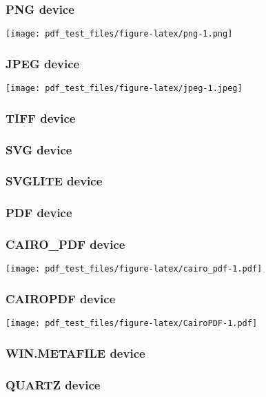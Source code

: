 \documentclass[]{article}
\begin{document}
\subsubsection{PNG device}\label{png-device}

\texttt{[image: pdf\_test\_files/figure-latex/png-1.png]}

\subsubsection{JPEG device}\label{jpeg-device}

\texttt{[image: pdf\_test\_files/figure-latex/jpeg-1.jpeg]}

\subsubsection{TIFF device}\label{tiff-device}

\subsubsection{SVG device}\label{svg-device}

\subsubsection{SVGLITE device}\label{svglite-device}

\subsubsection{PDF device}\label{pdf-device}

\subsubsection{CAIRO\_PDF device}\label{cairoux5fpdf-device}

\texttt{[image: pdf\_test\_files/figure-latex/cairo\_pdf-1.pdf]}

\subsubsection{CAIROPDF device}\label{cairopdf-device}

\texttt{[image: pdf\_test\_files/figure-latex/CairoPDF-1.pdf]}

\subsubsection{WIN.METAFILE device}\label{win.metafile-device}

\subsubsection{QUARTZ device}\label{quartz-device}
\end{document}

